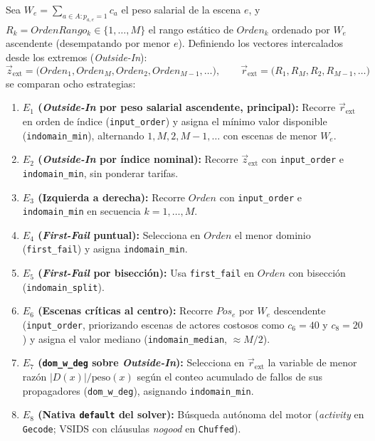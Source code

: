 Sea $W_e = \sum_{a \in A : p_{a,e}=1} c_a$ el peso salarial de la escena $e$, y $R_k = OrdenRango_k \in \{1,\dots,M\}$ el rango estático de $Orden_k$ ordenado por $W_e$ ascendente (desempatando por menor $e$). Definiendo los vectores intercalados desde los extremos (\emph{Outside-In}):
\begin{equation}
    \vec{z}_{\text{ext}} = \big(Orden_1, Orden_M, Orden_2, Orden_{M-1}, \dots\big), \qquad
    \vec{r}_{\text{ext}} = \big(R_1, R_M, R_2, R_{M-1}, \dots\big)
    \label{eq:vec_outside_in}
\end{equation}
se comparan ocho estrategias:
\begin{enumerate}
    \item \textbf{$E_1$ (\emph{Outside-In} por peso salarial ascendente, principal):} Recorre $\vec{r}_{\text{ext}}$ en orden de índice (\texttt{input\_order}) y asigna el mínimo valor disponible (\texttt{indomain\_min}), alternando $1, M, 2, M-1, \dots$ con escenas de menor $W_e$.
    \item \textbf{$E_2$ (\emph{Outside-In} por índice nominal):} Recorre $\vec{z}_{\text{ext}}$ con \texttt{input\_order} e \texttt{indomain\_min}, sin ponderar tarifas.
    \item \textbf{$E_3$ (Izquierda a derecha):} Recorre $Orden$ con \texttt{input\_order} e \texttt{indomain\_min} en secuencia $k = 1, \dots, M$.
    \item \textbf{$E_4$ (\emph{First-Fail} puntual):} Selecciona en $Orden$ el menor dominio (\texttt{first\_fail}) y asigna \texttt{indomain\_min}.
    \item \textbf{$E_5$ (\emph{First-Fail} por bisección):} Usa \texttt{first\_fail} en $Orden$ con bisección (\texttt{indomain\_split}).
    \item \textbf{$E_6$ (Escenas críticas al centro):} Recorre $Pos_e$ por $W_e$ descendente (\texttt{input\_order}, priorizando escenas de actores costosos como $c_6 = 40$ y $c_8 = 20$) y asigna el valor mediano (\texttt{indomain\_median}, $\approx M/2$).
    \item \textbf{$E_7$ (\texttt{dom\_w\_deg} sobre \emph{Outside-In}):} Selecciona en $\vec{r}_{\text{ext}}$ la variable de menor razón $|D(x)|/\text{peso}(x)$ según el conteo acumulado de fallos de sus propagadores (\texttt{dom\_w\_deg}), asignando \texttt{indomain\_min}.
    \item \textbf{$E_8$ (Nativa \texttt{default} del solver):} Búsqueda autónoma del motor (\emph{activity} en \texttt{Gecode}; VSIDS con cláusulas \emph{nogood} en \texttt{Chuffed}).
\end{enumerate}

